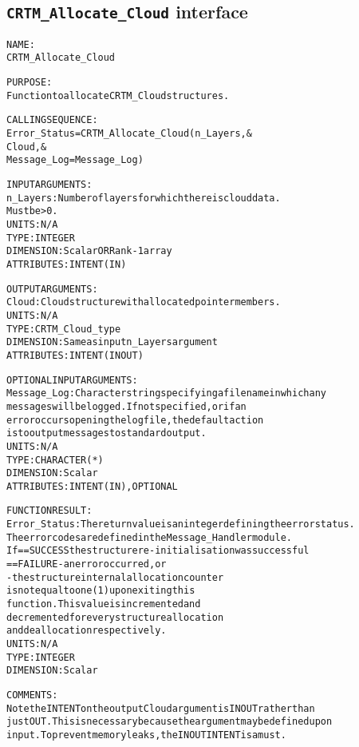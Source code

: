 \subsection{\texttt{CRTM\_Allocate\_Cloud} interface}
  \label{sec:CRTM_Allocate_Cloud_interface}
  \begin{alltt}
 
  NAME:
        CRTM_Allocate_Cloud
  
  PURPOSE:
        Function to allocate CRTM_Cloud structures.
 
  CALLING SEQUENCE:
        Error_Status = CRTM_Allocate_Cloud( n_Layers               , &
                                            Cloud                  , &
                                            Message_Log=Message_Log  )
 
  INPUT ARGUMENTS:
        n_Layers:     Number of layers for which there is cloud data.
                      Must be > 0.
                      UNITS:      N/A
                      TYPE:       INTEGER
                      DIMENSION:  Scalar OR Rank-1 array
                      ATTRIBUTES: INTENT(IN)
 
  OUTPUT ARGUMENTS:
        Cloud:        Cloud structure with allocated pointer members.
                      UNITS:      N/A
                      TYPE:       CRTM_Cloud_type
                      DIMENSION:  Same as input n_Layers argument
                      ATTRIBUTES: INTENT(IN OUT)
 
  OPTIONAL INPUT ARGUMENTS:
        Message_Log:  Character string specifying a filename in which any
                      messages will be logged. If not specified, or if an
                      error occurs opening the log file, the default action
                      is to output messages to standard output.
                      UNITS:      N/A
                      TYPE:       CHARACTER(*)
                      DIMENSION:  Scalar
                      ATTRIBUTES: INTENT(IN), OPTIONAL
 
  FUNCTION RESULT:
        Error_Status: The return value is an integer defining the error status.
                      The error codes are defined in the Message_Handler module.
                      If == SUCCESS the structure re-initialisation was successful
                         == FAILURE - an error occurred, or
                                    - the structure internal allocation counter
                                      is not equal to one (1) upon exiting this
                                      function. This value is incremented and
                                      decremented for every structure allocation
                                      and deallocation respectively.
                      UNITS:      N/A
                      TYPE:       INTEGER
                      DIMENSION:  Scalar
 
  COMMENTS:
        Note the INTENT on the output Cloud argument is IN OUT rather than
        just OUT. This is necessary because the argument may be defined upon
        input. To prevent memory leaks, the IN OUT INTENT is a must.
 
  \end{alltt}
